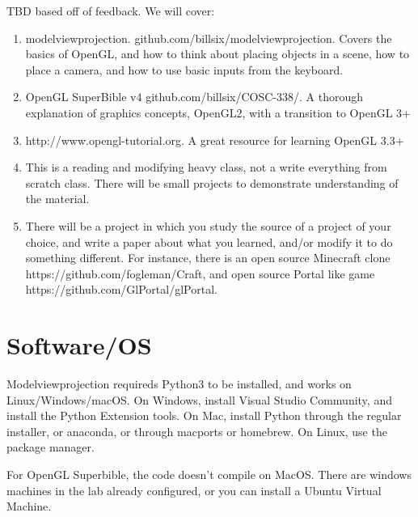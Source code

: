 \documentclass[11pt,twocolumn]{article}
\begin{document}
TBD based off of feedback.  We will cover:


\begin{enumerate}
\item{modelviewprojection. github.com/billsix/modelviewprojection.  Covers the basics of
  OpenGL, and how to think about placing objects in a scene, how to place a camera, and
how to use basic inputs from the keyboard.}
\item{OpenGL SuperBible v4 github.com/billsix/COSC-338/.  A thorough explanation of graphics
concepts, OpenGL2, with a transition to OpenGL 3+}
\item{http://www.opengl-tutorial.org. A great resource for learning OpenGL 3.3+}
\item{This is a reading and modifying heavy class, not a write everything from scratch class.
  There will be small projects to demonstrate understanding of the material.}
\item{There will be a project in which you study the source of a project of your choice,
  and write a paper about what you learned, and/or modify it to do something different.
  For instance, there is an open source Minecraft clone
  https://github.com/fogleman/Craft, and open source Portal like game https://github.com/GlPortal/glPortal.
  }

\end{enumerate}

\section{Software/OS}


Modelviewprojection requireds Python3 to be installed, and works on Linux/Windows/macOS.
On Windows, install Visual Studio Community, and install the Python Extension tools.
On Mac, install Python through the regular installer, or anaconda, or through macports or homebrew.
On Linux, use the package manager.

For OpenGL Superbible, the code doesn't compile on MacOS.  There are windows machines in the lab
already configured, or you can install a Ubuntu Virtual Machine.
\end{document}
